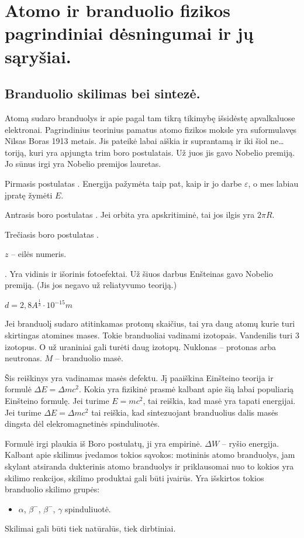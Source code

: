 \chapter{Atomo ir branduolio fizikos pagrindiniai dėsningumai ir jų
sąryšiai.}


\section{Branduolio skilimas bei sintezė.}

Atomą sudaro branduolys ir apie pagal tam tikrą tikimybę išsidėstę
apvalkaluose elektronai. Pagrindinius teorinius pamatus atomo
fizikos moksle yra suformulavęs Nilsas Boras 1913 metais. Jis
pateikė labai aiškia ir suprantamą ir iki šiol ne… toriją, kuri
yra apjungta trim boro postulatais. Už juos jis gavo Nobelio premiją.
Jo sūnus irgi yra Nobelio premijos lauretas.

Pirmasis postulatas . Energija pažymėta taip pat, kaip ir
jo darbe $\varepsilon$, o mes labiau įpratę žymėti $E$.

Antrasis boro postulatas . Jei orbita yra apskritiminė,
tai jos ilgis yra $2 \pi R $.

Trečiasis boro postulatas .

 $z$ – eilės numeris.

.
Yra vidinis ir išorinis fotoefektai. Už šiuos darbus Enšteinas gavo
Nobelio premiją. (Jis jos negavo už reliatyvumo teoriją.)

 $d = 2,8 A^{\frac{1}{3}} \cdot 10 ^{-15}m$

Jei branduolį sudaro atitinkamas protonų skaičius, tai yra daug
atomų kurie turi skirtingas atomines mases. Tokie branduoliai vadinami
izotopais. Vandenilis turi 3 izotopus. O už uraniniai gali turėti
daug izotopų.
Nuklonas – protonas arba neutronas. $M$ – branduolio masė.

 Šis reiškinys yra vadinamas masės defektu. Jį paaiškina
Einšteino teorija ir formulė $\Delta E = \Delta m c^{2}$. Kokia
yra fizikinė prasmė kalbant apie šią labai populiarią Einšteino
formulę. Jei turime $E = mc^{2}$, tai reiškia, kad masė yra tapati
energijai. Jei turime $\Delta E = \Delta mc^{2}$ tai reiškia, kad
sintezuojant branduolius dalis masės dingsta dėl elekromagnetinės
spinduliuotės. 

 Formulė irgi plaukia iš Boro postulatų, ji yra empirinė.
$\Delta W$ – ryšio energija. Kalbant apie skilimus įvedamos
tokios sąvokos: motininis atomo branduolys, jam skylant atsiranda
dukterinis atomo branduolys ir priklausomai nuo to kokios yra skilimo
reakcijos, skilimo produktai gali būti įvairūs. Yra išskirtos
tokios branduolio skilimo grupės:
\begin{itemize}
  \item $\alpha$, $\beta^{-}$, $\beta^{-}$, $\gamma$ spinduliuotė.
\end{itemize}
Skilimai gali būti tiek natūralūs, tiek dirbtiniai.


